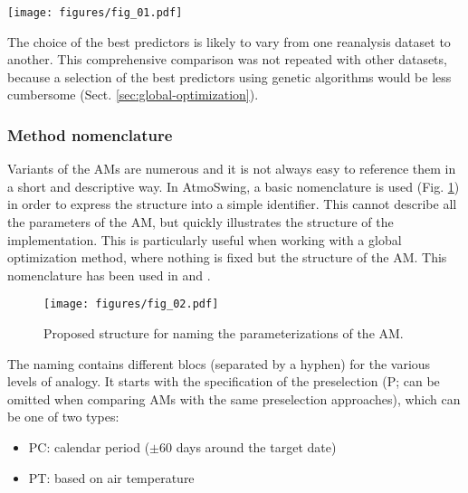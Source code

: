 \documentclass[review]{elsarticle}
\begin{document}
\begin{figure*}[hbt!]
	\texttt{[image: figures/fig\_01.pdf]}
	\caption{Performance score (CRPSS) of the 30 best variables from the NCEP/NCAR reanalysis dataset, when considered separately (no combination), for the Chablais region and the southeast ridges. The analogy criterion is S1 when there is an asterisk next to the variable name, and RMSE otherwise. Colour illustrates the variable type: green = atmospheric circulation, blue = moisture, orange = temperature, yellow = radiation, purple = vertical velocity, and gray = other. SLP stands for sea level pressure and Z for geopotential height. The blue square indicates the Binn station, which is analyzed in more detail later on.} 
	\label{figure:variable_exploration}
\end{figure*}

The choice of the best predictors is likely to vary from one reanalysis dataset to another. This comprehensive comparison was not repeated with other datasets, because a selection of the best predictors using genetic algorithms would be less cumbersome (Sect. \ref{sec:global-optimization}).


\subsubsection{Method nomenclature}

Variants of the AMs are numerous and it is not always easy to reference them in a short and descriptive way. In AtmoSwing, a basic nomenclature is used (Fig. \ref{figure:nomenclature}) in order to express the structure into a simple identifier. This cannot describe all the parameters of the AM, but quickly illustrates the structure of the implementation. This is particularly useful when working with a global optimization method, where nothing is fixed but the structure of the AM. This nomenclature has been used in \citet{Horton2017a, Horton2017b, Horton2018a} and \citet{Horton2018b}.

\begin{figure}[hbt!]
	\texttt{[image: figures/fig\_02.pdf]}
	\caption{Proposed structure for naming the parameterizations of the AM.}
	\label{figure:nomenclature}
\end{figure}

The naming contains different blocs (separated by a hyphen) for the various levels of analogy. It starts with the specification of the preselection (P; can be omitted when comparing AMs with the same preselection approaches), which can be one of two types:
\begin{itemize}
	\item PC: calendar period ($\pm 60$ days around the target date)
	\item PT: based on air temperature \citep{BenDaoud2010}
\end{itemize}
\end{document}
